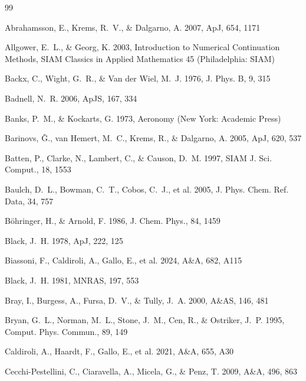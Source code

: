 \begin{thebibliography}{99}

Abrahamsson, E., Krems, R.~V., \& Dalgarno, A. 2007, ApJ, 654, 1171

Allgower, E.~L., \& Georg, K. 2003, Introduction to Numerical Continuation
Methods, SIAM Classics in Applied Mathematics 45 (Philadelphia: SIAM)

Backx, C., Wight, G.~R., \& Van der Wiel, M.~J. 1976, J. Phys. B, 9, 315

Badnell, N.~R. 2006, ApJS, 167, 334

Banks, P.~M., \& Kockarts, G. 1973, Aeronomy (New York: Academic Press)

Barinovs, \v{G}., van Hemert, M.~C., Krems, R., \& Dalgarno, A. 2005,
ApJ, 620, 537

Batten, P., Clarke, N., Lambert, C., \& Causon, D.~M. 1997,
SIAM J. Sci. Comput., 18, 1553

Baulch, D.~L., Bowman, C.~T., Cobos, C.~J., et al. 2005, J. Phys. Chem. Ref. Data, 34, 757

B\"ohringer, H., \& Arnold, F. 1986, J. Chem. Phys., 84, 1459

Black, J.~H. 1978, ApJ, 222, 125

Biassoni, F., Caldiroli, A., Gallo, E., et al. 2024, A\&A, 682, A115

Black, J.~H. 1981, MNRAS, 197, 553

Bray, I., Burgess, A., Fursa, D.~V., \& Tully, J.~A. 2000, A\&AS, 146, 481

Bryan, G.~L., Norman, M.~L., Stone, J.~M., Cen, R., \& Ostriker, J.~P. 1995,
Comput. Phys. Commun., 89, 149

Caldiroli, A., Haardt, F., Gallo, E., et al. 2021, A\&A, 655, A30

Cecchi-Pestellini, C., Ciaravella, A., Micela, G., \& Penz, T. 2009,
A\&A, 496, 863


\end{thebibliography}
